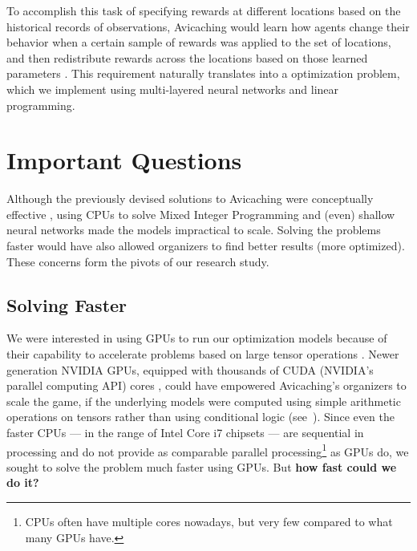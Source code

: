 To accomplish this task of specifying rewards at different locations based on the historical records of observations, Avicaching would learn how agents change their behavior when a certain sample of rewards was applied to the set of locations, and then redistribute rewards across the locations based on those learned parameters \cite{Xue2016Avi2}. This requirement naturally translates into a  optimization problem, which we implement using multi-layered neural networks and linear programming.

\section{Important Questions} \label{sec:Important Questions}
Although the previously devised solutions to Avicaching were conceptually effective \cite{Xue2016Avi1, Xue2016Avi2}, using CPUs to solve Mixed Integer Programming and (even) shallow neural networks made the models impractical to scale. Solving the problems faster would have also allowed organizers to find better results (more optimized). These concerns form the pivots of our research study.

\subsection{Solving Faster} \label{sec:Important Questions - Solving Faster}
We were interested in using GPUs to run our optimization models because of their capability to accelerate problems based on large tensor operations \cite{ParallelNVIDIA, cuDNNPaper}. Newer generation NVIDIA GPUs, equipped with thousands of CUDA (NVIDIA's parallel computing API) cores \cite{NVIDIA}, could have empowered Avicaching's organizers to scale the game, if the underlying models were computed using simple arithmetic operations on tensors rather than using conditional logic (see~). Since even the faster CPUs --- in the range of Intel Core i7 chipsets --- are sequential in processing and do not provide as comparable parallel processing\footnote{CPUs often have multiple cores nowadays, but very few compared to what many GPUs have.} as GPUs do, we sought to solve the problem much faster using GPUs. But \textbf{how fast could we do it?}

